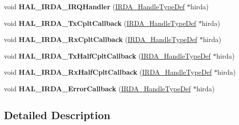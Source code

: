 \begin{DoxyCompactItemize}
\item 
void {\bfseries H\+A\+L\+\_\+\+I\+R\+D\+A\+\_\+\+I\+R\+Q\+Handler} (\hyperlink{struct_i_r_d_a___handle_type_def}{I\+R\+D\+A\+\_\+\+Handle\+Type\+Def} $\ast$hirda)\hypertarget{group___i_r_d_a___exported___functions___group2_ga816a681851f93d038e7bda5193b9d933}{}\label{group___i_r_d_a___exported___functions___group2_ga816a681851f93d038e7bda5193b9d933}

\item 
void {\bfseries H\+A\+L\+\_\+\+I\+R\+D\+A\+\_\+\+Tx\+Cplt\+Callback} (\hyperlink{struct_i_r_d_a___handle_type_def}{I\+R\+D\+A\+\_\+\+Handle\+Type\+Def} $\ast$hirda)\hypertarget{group___i_r_d_a___exported___functions___group2_gaafb45ea63d8cd87e6856c320135b78dd}{}\label{group___i_r_d_a___exported___functions___group2_gaafb45ea63d8cd87e6856c320135b78dd}

\item 
void {\bfseries H\+A\+L\+\_\+\+I\+R\+D\+A\+\_\+\+Rx\+Cplt\+Callback} (\hyperlink{struct_i_r_d_a___handle_type_def}{I\+R\+D\+A\+\_\+\+Handle\+Type\+Def} $\ast$hirda)\hypertarget{group___i_r_d_a___exported___functions___group2_gafbebae7dda1e7b54dc664c95802127c6}{}\label{group___i_r_d_a___exported___functions___group2_gafbebae7dda1e7b54dc664c95802127c6}

\item 
void {\bfseries H\+A\+L\+\_\+\+I\+R\+D\+A\+\_\+\+Tx\+Half\+Cplt\+Callback} (\hyperlink{struct_i_r_d_a___handle_type_def}{I\+R\+D\+A\+\_\+\+Handle\+Type\+Def} $\ast$hirda)\hypertarget{group___i_r_d_a___exported___functions___group2_gab2f5c3c37aae09155b6872f93f12761f}{}\label{group___i_r_d_a___exported___functions___group2_gab2f5c3c37aae09155b6872f93f12761f}

\item 
void {\bfseries H\+A\+L\+\_\+\+I\+R\+D\+A\+\_\+\+Rx\+Half\+Cplt\+Callback} (\hyperlink{struct_i_r_d_a___handle_type_def}{I\+R\+D\+A\+\_\+\+Handle\+Type\+Def} $\ast$hirda)\hypertarget{group___i_r_d_a___exported___functions___group2_gab164406c67c36ab562580e3fce8d6165}{}\label{group___i_r_d_a___exported___functions___group2_gab164406c67c36ab562580e3fce8d6165}

\item 
void {\bfseries H\+A\+L\+\_\+\+I\+R\+D\+A\+\_\+\+Error\+Callback} (\hyperlink{struct_i_r_d_a___handle_type_def}{I\+R\+D\+A\+\_\+\+Handle\+Type\+Def} $\ast$hirda)\hypertarget{group___i_r_d_a___exported___functions___group2_ga85ffb4337deb42820d49f3882a728f7f}{}\label{group___i_r_d_a___exported___functions___group2_ga85ffb4337deb42820d49f3882a728f7f}

\end{DoxyCompactItemize}


\subsection{Detailed Description}
